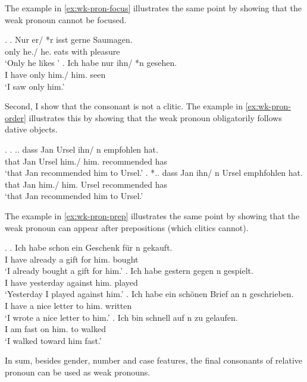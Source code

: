 The example in \ref{ex:wk-pron-focus} illustrates the same point by showing that the weak pronoun cannot be focused.

\ex.\label{ex:wk-pron-focus}
\ag. Nur er/ *r isst gerne Saumagen.\\
 only he./ he. eats {with pleasure} \\
 `Only he likes '
\bg. Ich habe nur ihn/ *n gesehen.\\
 I have only him./ him. seen\\
 `I saw only him.'

Second, I show that the consonant is not a clitic.
The example in \ref{ex:wk-pron-order} illustrates this by showing that the weak pronoun obligatorily follows dative objects.

\ex.\label{ex:wk-pron-order}
\ag. .. dass Jan Ursel ihn/ n empfohlen hat.\\
 {} that Jan Ursel him./ him. recommended has\\
 `that Jan recommended him to Ursel.'
\bg. *.. dass Jan ihn/ n Ursel emphfohlen hat.\\
 {} that Jan him./ him. Ursel recommended has\\
 `that Jan recommended him to Ursel.'

The example in \ref{ex:wk-pron-prep} illustrates the same point by showing that the weak pronoun can appear after prepositions (which clitics cannot).

\ex.\label{ex:wk-pron-prep}
\ag. Ich habe schon ein Geschenk für n gekauft.\\
 I have already a gift for him. bought\\
 `I already bought a gift for him.'
\bg. Ich habe gestern gegen n gespielt.\\
I have yesterday against him. played\\
`Yesterday I played against him.'
\bg. Ich habe ein schönen Brief an n geschrieben.\\
I have a nice letter to him. written\\
`I wrote a nice letter to him.'
\bg. Ich bin schnell auf n zu gelaufen.\\
I am fast on him. to walked\\
`I walked toward him fast.'

In sum, besides gender, number and case features, the final consonants of relative pronoun can be used as weak pronouns.

